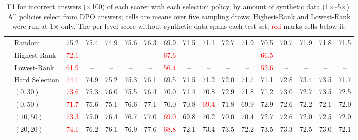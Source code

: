\begin{table}[t]
\begin{tabular}{llccccccccccccccc}
 & Random & 75.2 & 75.4 & 74.9 & 75.6 & 76.3 & 69.9 & 71.5 & 71.1 & 72.7 & 71.9 & 70.5 & 70.7 & 71.9 & 71.8 & 71.5 \\
 & Highest-Rank & \textcolor{red}{72.1} & -- & -- & -- & -- & \textcolor{red}{67.6} & -- & -- & -- & -- & \textcolor{red}{66.5} & -- & -- & -- & -- \\
 & Lowest-Rank & \textcolor{red}{61.9} & -- & -- & -- & -- & \textcolor{red}{56.4} & -- & -- & -- & -- & \textcolor{red}{52.6} & -- & -- & -- & -- \\
 & Hard Selection & \textcolor{red}{74.1} & 74.9 & 75.2 & 75.3 & 76.1 & 69.5 & 71.5 & 71.2 & 72.0 & 71.7 & 71.1 & 72.8 & 73.4 & 73.5 & 71.7 \\
 & $(0, 30)$ & \textcolor{red}{73.6} & 75.3 & 76.0 & 75.5 & 76.4 & 70.0 & 71.4 & 70.8 & 72.9 & 71.8 & 71.2 & 73.0 & 72.7 & 73.5 & 72.5 \\
 & $(0, 50)$ & \textcolor{red}{71.7} & 75.6 & 75.1 & 76.6 & 77.1 & 70.0 & 70.8 & \textcolor{red}{69.4} & 71.8 & 69.9 & 72.9 & 72.6 & 72.2 & 72.1 & 72.0 \\
 & $(10, 50)$ & \textcolor{red}{73.3} & 75.0 & 76.4 & 76.7 & 77.0 & \textcolor{red}{69.0} & 69.8 & 70.2 & 70.0 & 70.4 & 72.7 & 72.6 & 72.0 & 72.5 & 72.0 \\
 & $(20, 20)$ & \textcolor{red}{74.1} & 76.2 & 76.1 & 76.9 & 77.6 & \textcolor{red}{68.8} & 72.1 & 73.4 & 73.5 & 72.2 & 73.5 & 73.3 & 72.5 & 73.0 & 72.1 \\
\bottomrule
\end{tabular}
\caption{F1 for incorrect answers ($\times$100) of each scorer with each selection policy, by amount of synthetic data (1$\times$--5$\times$). All policies select from DPO answers; cells are means over five sampling draws; Highest-Rank and Lowest-Rank were run at 1$\times$ only. The per-level score without synthetic data spans each test set; \textcolor{red}{red} marks cells below it.}
\label{tab:appendix-selection-amount-level-0}
\end{table}

